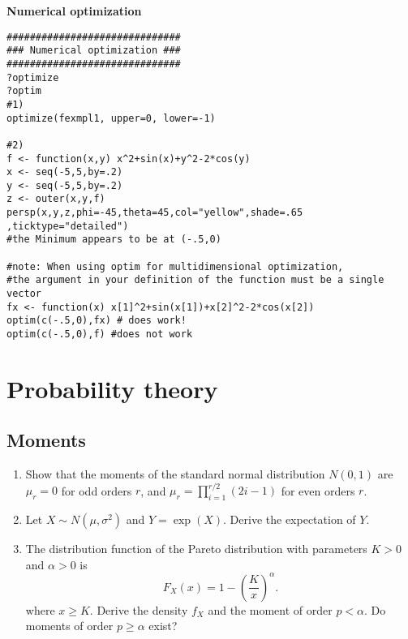 \documentclass{article}
\begin{document}
\begin{solution}
\textbf{Numerical optimization}

\begin{verbatim}
##############################
### Numerical optimization ###
##############################
?optimize
?optim
#1)
optimize(fexmpl1, upper=0, lower=-1)

#2)
f <- function(x,y) x^2+sin(x)+y^2-2*cos(y)
x <- seq(-5,5,by=.2)
y <- seq(-5,5,by=.2)
z <- outer(x,y,f)
persp(x,y,z,phi=-45,theta=45,col="yellow",shade=.65 ,ticktype="detailed")
#the Minimum appears to be at (-.5,0)

#note: When using optim for multidimensional optimization,
#the argument in your definition of the function must be a single vector
fx <- function(x) x[1]^2+sin(x[1])+x[2]^2-2*cos(x[2])
optim(c(-.5,0),fx) # does work!
optim(c(-.5,0),f) #does not work
\end{verbatim}
\end{solution}

\section{Probability theory\label{repetition1}}

\subsection{Moments\label{moments}}

\begin{enumerate}
\item Show that the moments of the standard normal distribution $N(0,1)$ are
$\mu _{r}=0$ for odd orders $r$, and $\mu _{r}=\prod_{i=1}^{r/2}\left(
2i-1\right) $ for even orders $r$.

\item Let $X\sim N(\mu ,\sigma ^{2})$ and $Y=\exp (X)$. Derive the
expectation of $Y$.

\item The distribution function of the Pareto distribution with parameters $%
K>0$ and $\alpha >0$ is%
\begin{equation*}
F_{X}(x)=1-\left( \frac{K}{x}\right) ^{\alpha }.
\end{equation*}%
where $x\geq K$. Derive the density $f_{X}$ and the moment of order $%
p<\alpha $. Do moments of order $p\geq \alpha $ exist?
\end{enumerate}
\end{document}
